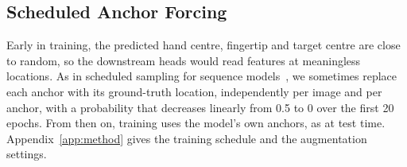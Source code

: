 \subsection{Scheduled Anchor Forcing}\label{sec:forcing}
Early in training, the predicted hand centre, fingertip and target centre are close to random, so the downstream heads would read features at meaningless locations. As in scheduled sampling for sequence models~\cite{bengio2015scheduled}, we sometimes replace each anchor with its ground-truth location, independently per image and per anchor, with a probability that decreases linearly from 0.5 to 0 over the first 20 epochs. From then on, training uses the model's own anchors, as at test time. Appendix~\ref{app:method} gives the training schedule and the augmentation settings.
